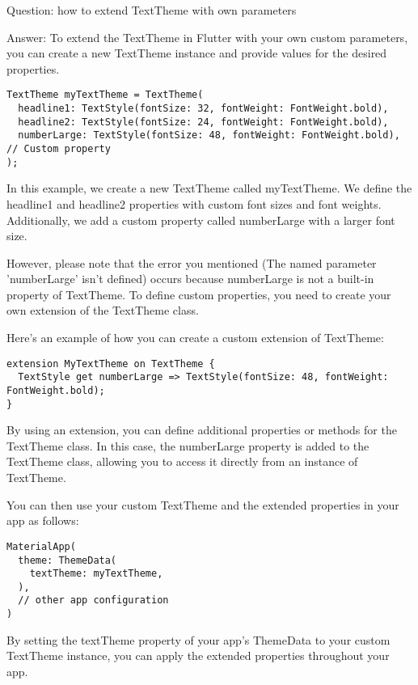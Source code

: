 

Question: how to extend TextTheme with own parameters

Answer: To extend the TextTheme in Flutter with your own custom parameters, you can create a new TextTheme instance 
and provide values for the desired properties.

\begin{lstlisting}
TextTheme myTextTheme = TextTheme(
  headline1: TextStyle(fontSize: 32, fontWeight: FontWeight.bold),
  headline2: TextStyle(fontSize: 24, fontWeight: FontWeight.bold),
  numberLarge: TextStyle(fontSize: 48, fontWeight: FontWeight.bold), // Custom property
);
\end{lstlisting}

In this example, we create a new TextTheme called myTextTheme. We define the headline1 and headline2 properties with 
custom font sizes and font weights. Additionally, we add a custom property called numberLarge with a larger font size.

However, please note that the error you mentioned (The named parameter 'numberLarge' isn't defined) occurs because 
numberLarge is not a built-in property of TextTheme. To define custom properties, you need to create your own 
extension of the TextTheme class.

Here's an example of how you can create a custom extension of TextTheme:

\begin{lstlisting}
extension MyTextTheme on TextTheme {
  TextStyle get numberLarge => TextStyle(fontSize: 48, fontWeight: FontWeight.bold);
}
\end{lstlisting}

By using an extension, you can define additional properties or methods for the TextTheme class. In this case, 
the numberLarge property is added to the TextTheme class, allowing you to access it directly from an instance of 
TextTheme.

You can then use your custom TextTheme and the extended properties in your app as follows:

\begin{lstlisting}
MaterialApp(
  theme: ThemeData(
    textTheme: myTextTheme,
  ),
  // other app configuration
)
\end{lstlisting}

By setting the textTheme property of your app's ThemeData to your custom TextTheme instance, you can apply the 
extended properties throughout your app.

